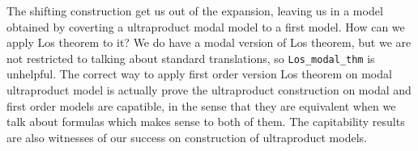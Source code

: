 \documentclass[letterpaper]{article}
\begin{document}
The shifting construction get us out of the expansion, leaving us in a model obtained by coverting a ultraproduct modal model to a first model. How can we apply Los theorem to it? We do have a modal version of Los theorem, but we are not restricted to talking about standard translations, so \texttt{Los_modal_thm} is unhelpful. The correct way to apply first order version Los theorem on modal ultraproduct model is actually prove the ultraproduct construction on modal and first order models are capatible, in the sense that they are equivalent when we talk about formulas which makes sense to both of them. The capitability results are also witnesses of our success on construction of ultraproduct models. %
\end{document}
